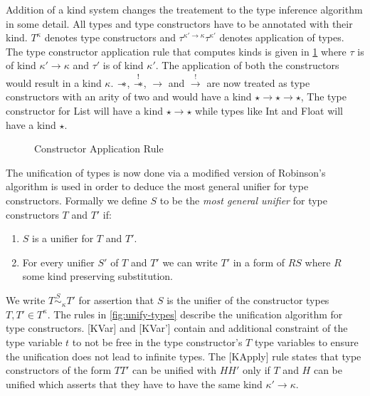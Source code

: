 Addition of a kind system changes the treatement to the type inference algorithm in some detail.
All types and type constructors have to be annotated with their kind. $T^\kappa$ denotes type constructors
and $\tau^{\kappa' \rightarrow \kappa}\tau^{\kappa'}$ denotes application of types.
The type constructor application rule that computes kinds is given in \cref{fig:constructor-application} where
$\tau$ is of kind $\kappa' \rightarrow \kappa$ and $\tau'$ is of kind $\kappa'$. The application
of both the constructors would result in a kind $\kappa$.
$\sepimp$, $\overset{!}{\sepimp}$, $\rightarrow$ and $\overset{!}{\rightarrow}$
are now treated as type constructors with an arity of two and would have a kind $\star \rightarrow \star \rightarrow \star$, The
type constructor for List will have a kind $\star \rightarrow \star$ while
types like Int and Float will have a kind $\star$.

\begin{figure}
  \begin{framed}
    \begin{prooftree}
    \end{prooftree}
  \end{framed}
  \caption{Constructor Application Rule}
  \label{fig:constructor-application}
\end{figure}

The unification of types is now done via a modified version of Robinson's algorithm \citeyearpar{robinson_machine-oriented_1965}
is used in order to deduce the most general unifier for type constructors.
Formally we define $S$ to be the {\it most general unifier} for type constructors $T$ and $T'$ if:
\begin{enumerate}
  \item $S$ is a unifier for $T$ and $T'$.
  \item For every unifier $S'$ of $T$ and $T'$ we can write $T'$ in a form of
    $R S$ where $R$ some kind preserving substitution.
\end{enumerate}
We write $T \overset{S}{\sim}_{\kappa} T'$ for assertion that $S$ is the unifier
of the constructor types $T, T' \in T^{\kappa}$. The rules in \cref{fig:unify-types}
describe the unification algorithm for type constructors. [KVar] and [KVar'] contain
and additional constraint of the type variable $t$ to not be free in the type constructor's $T$
type variables to ensure the unification does not lead to infinite types. The [KApply] rule
states that type constructors of the form $T T'$ can be unified with $H H'$ only if $T$ and $H$
can be unified which asserts that they have to have the same kind $\kappa' \rightarrow \kappa$.

